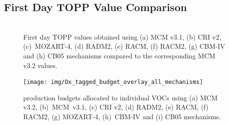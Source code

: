 
\subsection{First Day TOPP Value Comparison} \label{ss:day1} %

\begin{figure}
    \begin{center}
        \includegraphics[width=\textwidth]{img/first_day_values}
    \end{center}
    \caption{First day TOPP values obtained using (a) MCM v3.1, (b) CRI v2, \mbox{(c) MOZART-4}, (d) RADM2, (e) RACM, (f) RACM2, (g) CBM-IV and (h) CB05 mechanisms compared to the corresponding MCM v3.2 values.}
    \label{f:first_day}
\end{figure}

\begin{figure}
    \begin{center}
        \texttt{[image: img/Ox\_tagged\_budget\_overlay\_all\_mechanisms]}
    \end{center}
    \caption{ production budgets allocated to individual VOCs using (a) MCM v3.2, \mbox{(b) MCM v3.1}, (c) CRI v2, (d) RADM2, (e) RACM, (f) RACM2, (g) MOZART-4, \mbox{(h) CBM-IV} and (i) CB05 mechanisms.}
    \label{f:Ox_tagged_budgets}
\end{figure}

